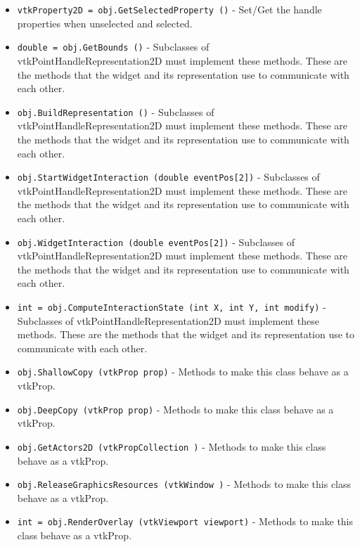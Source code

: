 \begin{itemize}
\item  \verb|vtkProperty2D = obj.GetSelectedProperty ()| -  Set/Get the handle properties when unselected and selected.

\item  \verb|double = obj.GetBounds ()| -  Subclasses of vtkPointHandleRepresentation2D must implement these
 methods. These are the methods that the widget and its representation
 use to communicate with each other.

\item  \verb|obj.BuildRepresentation ()| -  Subclasses of vtkPointHandleRepresentation2D must implement these
 methods. These are the methods that the widget and its representation
 use to communicate with each other.

\item  \verb|obj.StartWidgetInteraction (double eventPos[2])| -  Subclasses of vtkPointHandleRepresentation2D must implement these
 methods. These are the methods that the widget and its representation
 use to communicate with each other.

\item  \verb|obj.WidgetInteraction (double eventPos[2])| -  Subclasses of vtkPointHandleRepresentation2D must implement these
 methods. These are the methods that the widget and its representation
 use to communicate with each other.

\item  \verb|int = obj.ComputeInteractionState (int X, int Y, int modify)| -  Subclasses of vtkPointHandleRepresentation2D must implement these
 methods. These are the methods that the widget and its representation
 use to communicate with each other.

\item  \verb|obj.ShallowCopy (vtkProp prop)| -  Methods to make this class behave as a vtkProp.

\item  \verb|obj.DeepCopy (vtkProp prop)| -  Methods to make this class behave as a vtkProp.

\item  \verb|obj.GetActors2D (vtkPropCollection )| -  Methods to make this class behave as a vtkProp.

\item  \verb|obj.ReleaseGraphicsResources (vtkWindow )| -  Methods to make this class behave as a vtkProp.

\item  \verb|int = obj.RenderOverlay (vtkViewport viewport)| -  Methods to make this class behave as a vtkProp.

\end{itemize}
